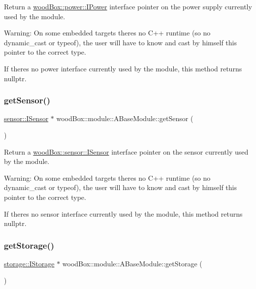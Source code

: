 Return a \mbox{\hyperlink{classwood_box_1_1power_1_1_i_power}{wood\+Box\+::power\+::\+I\+Power}} interface pointer on the power supply currently used by the module.

Warning\+: On some embedded targets there\textquotesingle{}s no C++ runtime (so no {\ttfamily dynamic\+\_\+cast} or {\ttfamily typeof}), the user will have to know and cast by himself this pointer to the correct type.

If there\textquotesingle{}s no power interface currently used by the module, this method returns {\ttfamily nullptr}. \mbox{\label{classwood_box_1_1module_1_1_a_base_module_acd7e95a20964a1f9ce2dbbbf629fe3dc}} 
\subsubsection{\texorpdfstring{get\+Sensor()}{getSensor()}}
{\footnotesize\ttfamily \mbox{\hyperlink{classwood_box_1_1sensor_1_1_i_sensor}{sensor\+::\+I\+Sensor}} $\ast$ wood\+Box\+::module\+::\+A\+Base\+Module\+::get\+Sensor (\begin{DoxyParamCaption}{ }\end{DoxyParamCaption})}

Return a \mbox{\hyperlink{classwood_box_1_1sensor_1_1_i_sensor}{wood\+Box\+::sensor\+::\+I\+Sensor}} interface pointer on the sensor currently used by the module.

Warning\+: On some embedded targets there\textquotesingle{}s no C++ runtime (so no {\ttfamily dynamic\+\_\+cast} or {\ttfamily typeof}), the user will have to know and cast by himself this pointer to the correct type.

If there\textquotesingle{}s no sensor interface currently used by the module, this method returns {\ttfamily nullptr}. \mbox{\label{classwood_box_1_1module_1_1_a_base_module_ad55a3509dc2bcb2fc5c8abc4a4db1cf1}} 
\subsubsection{\texorpdfstring{get\+Storage()}{getStorage()}}
{\footnotesize\ttfamily \mbox{\hyperlink{classwood_box_1_1storage_1_1_i_storage}{storage\+::\+I\+Storage}} $\ast$ wood\+Box\+::module\+::\+A\+Base\+Module\+::get\+Storage (\begin{DoxyParamCaption}{ }\end{DoxyParamCaption})}

